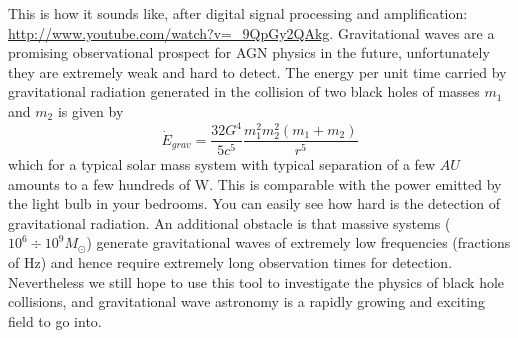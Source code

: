This is how it sounds like, after digital signal processing and amplification: \url{http://www.youtube.com/watch?v=_9QpGy2QAkg}. Gravitational waves are a promising observational prospect for AGN physics in the future, unfortunately they are extremely weak and hard to detect. The energy per unit time carried by gravitational radiation generated in the collision of two black holes of masses $m_1$ and $m_2$ is given by
\begin{equation}
\dot{E}_{grav} = \frac{32G^4}{5c^5}\frac{m_1^2m_2^2(m_1+m_2)}{r^5}
\end{equation} 
which for a typical solar mass system with typical separation of a few $AU$ amounts to a few hundreds of W. This is comparable with the power emitted by the light bulb in your bedrooms. You can easily see how hard is the detection of gravitational radiation. An additional obstacle is that massive systems ($10^6\div 10^9 M_\odot$) generate gravitational waves of extremely low frequencies (fractions of Hz) and hence require extremely long observation times for detection. Nevertheless we still hope to use this tool to investigate the physics of black hole collisions, and gravitational wave astronomy is a rapidly growing and exciting field to go into.